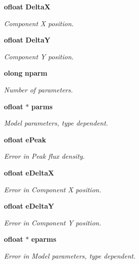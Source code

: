 \begin{CompactItemize}
{\bf ofloat} {\bf Delta\-X}
\begin{CompactList}\small\item\em Component X position. \item\end{CompactList}\item 
{\bf ofloat} {\bf Delta\-Y}
\begin{CompactList}\small\item\em Component Y position. \item\end{CompactList}\item 
{\bf olong} {\bf nparm}
\begin{CompactList}\small\item\em Number of parameters. \item\end{CompactList}\item 
{\bf ofloat} $\ast$ {\bf parms}
\begin{CompactList}\small\item\em Model parameters, type dependent. \item\end{CompactList}\item 
{\bf ofloat} {\bf e\-Peak}
\begin{CompactList}\small\item\em Error in Peak flux density. \item\end{CompactList}\item 
{\bf ofloat} {\bf e\-Delta\-X}
\begin{CompactList}\small\item\em Error in Component X position. \item\end{CompactList}\item 
{\bf ofloat} {\bf e\-Delta\-Y}
\begin{CompactList}\small\item\em Error in Component Y position. \item\end{CompactList}\item 
{\bf ofloat} $\ast$ {\bf eparms}
\begin{CompactList}\small\item\em Error in Model parameters, type dependent. \item\end{CompactList}\end{CompactItemize}



